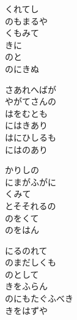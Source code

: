 \documentclass[10pt,b5j]{tarticle} %
\begin{document}
\vspace{1.5em} %
\newcommand{\linespace}{0.5em} %
\newcommand{\blocksize}{0.5\hsize} %
\begin{enumerate} %
    \begin{minipage}[c]{\blocksize}
    
        \vspace{\linespace}
        \item
        くれてし\\
        のもまるや\\
        くもみて\\
        きに\\
        のと\\
        のにきぬ
        
        \vspace{\linespace}
        \item
        さあれへばが\\
        やがてさんの\\
        はをむとも\\
        にはきあり\\
        はにひしるも\\
        にはのあり
        
        \vspace{\linespace}
        \item
        かりしの\\
        にまがふがに\\
        くみて\\
        とそそれるの\\
        のをくて\\
        のをはん
        
        \vspace{\linespace}
        \item
        にるのれて\\
        のまだしくも\\
        のとして\\
        きをふらん\\
        のにもたぐふべき\\
        きをはずや
        

\end{minipage}
\end{enumerate}
\end{document}

